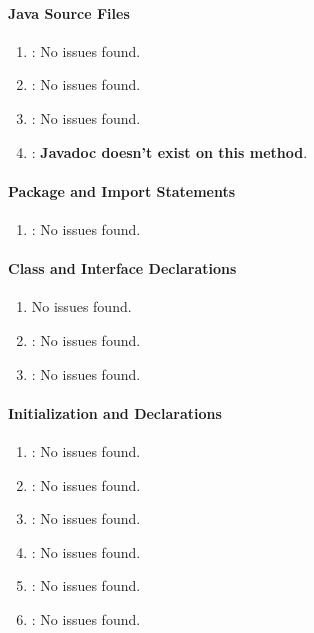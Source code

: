 \paragraph{Java Source Files} %
\label{par:java_source_files}

\begin{enumerate} [resume]
	\item \emph{\checkT}: No issues found.
	\item \emph{\checkU}: No issues found.
	\item \emph{\checkV}: No issues found.
	\item \emph{\checkW}: \textbf{Javadoc doesn't exist on this method}.
\end{enumerate}

\paragraph{Package and Import Statements} %
\label{par:package_and_import_statements}

\begin{enumerate} [resume]
	\item \emph{\checkX}: No issues found.
\end{enumerate}

\paragraph{Class and Interface Declarations} %
\label{par:class_and_interface_declarations}

\begin{enumerate} [resume]
	\item \emph{\checkY}No issues found.
	\item \emph{\checkZ}: No issues found.
	\item \emph{\checkAA}: No issues found.
\end{enumerate}

\paragraph{Initialization and Declarations} %
\label{par:initialization_and_declarations}

\begin{enumerate} [resume]
	\item \emph{\checkAB}: No issues found.
	\item \emph{\checkAC}: No issues found.
	\item \emph{\checkAD}: No issues found.
	\item \emph{\checkAE}: No issues found.
	\item \emph{\checkAF}: No issues found.
	\item \emph{\checkAG}: No issues found.
\end{enumerate}

